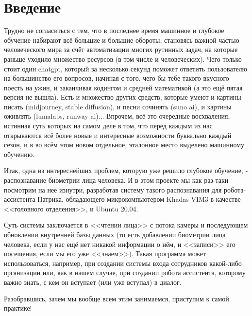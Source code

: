 \documentclass[a4paper,hidelinks,14pt]{extarticle}
\newcommand{\anonsection}[1]{\section*{#1}\addcontentsline{toc}{section}{#1}}
\begin{document}
	
	\anonsection{Введение}
	Трудно не согласиться с тем, что в последнее время машинное и глубокое обучение набирают всё большие и большие обороты, становясь важной частью человеческого мира за счёт автоматизации многих рутинных задач, на которые раньше уходило множество ресурсов (в том числе и человеческих). Чего только стоит один chatgpt, который за несколько секунд поможет ответить пользователю на большинство его вопросов, начиная с того, чего бы тебе такого вкусного поесть на ужин, и заканчивая кодингом и средней математикой (а это ещё пятая версия не вышла). Есть и множество других средств, которые умеют и картины писать (midjourney, stable diffusion), и песни сочинять (suno ai), и картины оживлять (lumalabs, runway ai)... Впрочем, всё это очередные восхваления, истинная суть которых на самом деле в том, что перед каждым из нас открываются всё более новые и интересные возможности буквально каждый сезон, и в во всём этом новом отдельное, эталонное место выделено машинному обучению.
	
	Итак, одна из интереснейших проблем, которую уже решило глубокое обучение, - распознавание биометрии лица человека. И в этом проекте мы как раз-таки посмотрим на неё изнутри, разработав систему такого распознавания для робота-ассистента Патрика, обладающего микрокомпьютером Khadas VIM3 в качестве <<головного отделения>>, и Ubuntu 20.04. 
	
	Суть системы заключается в <<чтении лица>> с потока камеры и последующем обновлении внутренней базы данных (то есть добавлении биометрии лица человека, если у нас ещё нет никакой информации о нём, и <<записи>> его посещения, если мы его уже <<знаем>>). Такая программа может использоваться, например, при создании системы входа сотрудников какой-либо организации или, как в нашем случае, при создании робота ассистента, которому важно знать, с кем он вступает (или уже вступал) в диалог.
	
	Разобравшись, зачем мы вообще всем этим занимаемся, приступим к самой практике!
	
	\newpage
\end{document}
